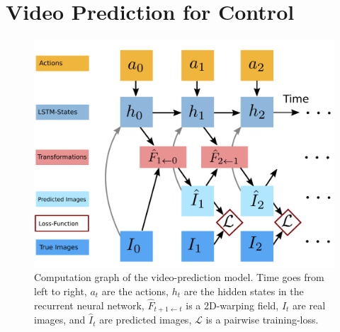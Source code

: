 \section{Video Prediction for Control}
\label{sec:model}

\begin{figure}[t]
	\centering
	\includegraphics[width=0.8\columnwidth]{images_general/prediction_model.pdf}
	\caption{\small{Computation graph of the video-prediction model. Time goes from left to right, $a_t$ are the actions, $h_t$ are the hidden states in the recurrent neural network, $\hat{F}_{t+1 \leftarrow t}$ is a 2D-warping field, $I_t$ are real images, and $\hat{I}_t$ are predicted images, $\mathcal{L}$ is a pairwise training-loss.}}   
	\label{fig:prediction_model}
\end{figure}

